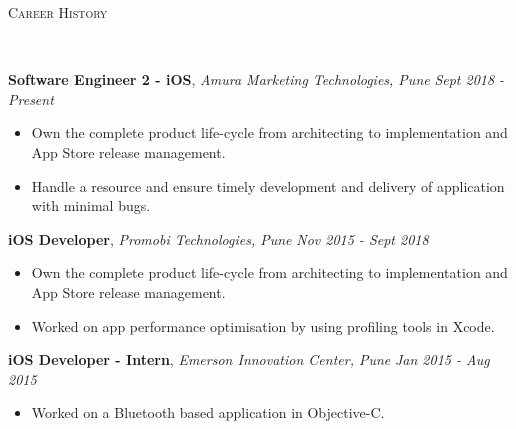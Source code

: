 \documentclass[9pt]{article}
\newenvironment{changemargin}[2]{%
  \begin{list}{}{%
    \setlength{\topsep}{0pt}%
    \setlength{\leftmargin}{#1}%
    \setlength{\rightmargin}{#2}%
    \setlength{\listparindent}{\parindent}%
    \setlength{\itemindent}{\parindent}%
    \setlength{\parsep}{\parskip}%
  }%
  \item[]}{\end{list}
}
\newcommand{\lineover}{
    \begin{changemargin}{-0.05in}{-0.05in}
        \vspace*{-8pt}
        \hrulefill \\
        \vspace*{-2pt}
    \end{changemargin}
}
\newcommand{\header}[1]{
    \begin{changemargin}{-0.5in}{-0.5in}
        \scshape{#1}\\
    \lineover
    \end{changemargin}
}
\newenvironment{body} {
    \vspace*{-16pt}
    \begin{changemargin}{-0.25in}{-0.5in}
  }
    {\end{changemargin}
}
\begin{document}
\header{Career History}

\begin{body}
    \vspace{14pt}
    \textbf{Software Engineer 2 - iOS}, \emph{Amura Marketing Technologies, Pune} \hfill \emph{Sept 2018 - Present}\\
    \begin{itemize} \itemsep -0pt  %
        \item Own the complete product life-cycle from architecting to implementation and App Store release management.
    \end{itemize}
    \begin{itemize} \itemsep -0pt  %
        \item Handle a resource and ensure timely development and delivery of application with minimal bugs.
    \end{itemize}
    \vspace*{-4pt}

    \vspace{14pt}
    \textbf{iOS Developer}, \emph{Promobi Technologies, Pune} \hfill \emph{Nov 2015 - Sept 2018}\\
    \begin{itemize} \itemsep -0pt  %
        \item Own the complete product life-cycle from architecting to implementation and App Store release management.
    \end{itemize}
    \begin{itemize} \itemsep -0pt  %
        \item Worked on app performance optimisation by using profiling tools in Xcode.
    \end{itemize}
    \vspace*{-4pt}

    \vspace{14pt}
    \textbf{iOS Developer - Intern}, \emph{Emerson Innovation Center, Pune} \hfill \emph{Jan 2015 - Aug 2015}\\
    \vspace*{-4pt}
    \begin{itemize} \itemsep -0pt  %
        \item Worked on a Bluetooth based application in Objective-C.
    \end{itemize}

\end{body}
\end{document}

